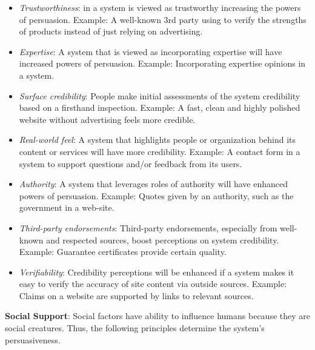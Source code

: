 \begin{itemize}
\item \emph{Trustworthiness}: in a system is viewed as trustworthy increasing the powers of persuasion.
Example: A well-known 3rd party using to verify the strengths of products instead of just relying on advertising.
\item \emph{Expertise}: A system that is viewed as incorporating expertise will have increased powers of persuasion.
Example: Incorporating expertise opinions in a system.
\item \emph{Surface credibility}: People make initial assessments of the system credibility based on a firsthand inspection.
Example: A fast, clean and highly polished website without advertising feels more credible.
\item \emph{Real-world feel}: A system that highlights people or organization behind its content or services will have more credibility.
Example: A contact form in a system to support questions and/or feedback from its users.
\item \emph{Authority}: A system that leverages roles of authority will have enhanced powers of persuasion.
Example: Quotes given by an authority, such as the government in a web-site.
\item \emph{Third-party endorsements}: Third-party endorsements, especially from well-known and respected sources, boost perceptions on system credibility.
Example: Guarantee certificates provide certain quality.
\item \emph{Verifiability}: Credibility perceptions will be enhanced if a system makes it easy to verify the accuracy of site content via outside sources.
Example: Claims on a website are supported by links to relevant
sources.
\end{itemize}

\textbf{Social Support}: Social factors have ability to influence humans because they are social creatures. Thus, the following principles determine the system's persuasiveness.

